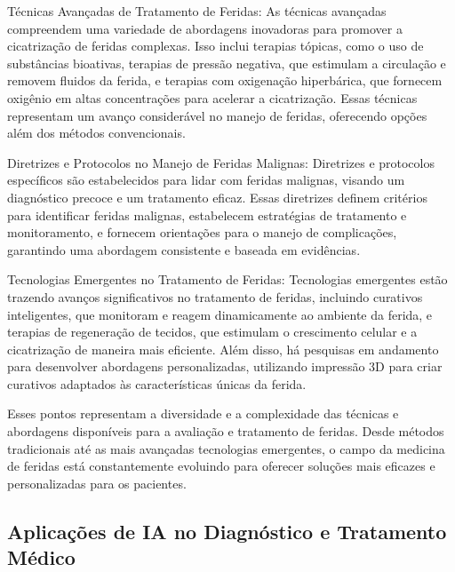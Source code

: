 Técnicas Avançadas de Tratamento de Feridas: As técnicas avançadas compreendem uma variedade de abordagens inovadoras para promover a cicatrização de feridas complexas. Isso inclui terapias tópicas, como o uso de substâncias bioativas, terapias de pressão negativa, que estimulam a circulação e removem fluidos da ferida, e terapias com oxigenação hiperbárica, que fornecem oxigênio em altas concentrações para acelerar a cicatrização. Essas técnicas representam um avanço considerável no manejo de feridas, oferecendo opções além dos métodos convencionais.

Diretrizes e Protocolos no Manejo de Feridas Malignas: Diretrizes e protocolos específicos são estabelecidos para lidar com feridas malignas, visando um diagnóstico precoce e um tratamento eficaz. Essas diretrizes definem critérios para identificar feridas malignas, estabelecem estratégias de tratamento e monitoramento, e fornecem orientações para o manejo de complicações, garantindo uma abordagem consistente e baseada em evidências.

Tecnologias Emergentes no Tratamento de Feridas: Tecnologias emergentes estão trazendo avanços significativos no tratamento de feridas, incluindo curativos inteligentes, que monitoram e reagem dinamicamente ao ambiente da ferida, e terapias de regeneração de tecidos, que estimulam o crescimento celular e a cicatrização de maneira mais eficiente. Além disso, há pesquisas em andamento para desenvolver abordagens personalizadas, utilizando impressão 3D para criar curativos adaptados às características únicas da ferida.

Esses pontos representam a diversidade e a complexidade das técnicas e abordagens disponíveis para a avaliação e tratamento de feridas. Desde métodos tradicionais até as mais avançadas tecnologias emergentes, o campo da medicina de feridas está constantemente evoluindo para oferecer soluções mais eficazes e personalizadas para os pacientes.

\subsection{Aplicações de IA no Diagnóstico e Tratamento Médico}

